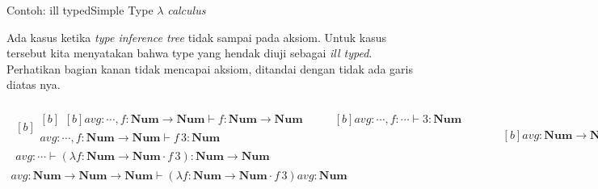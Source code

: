 \documentclass[aspectratio=1610,10pt,handout]{beamer}
\newcommand{\lc}{$\lambda$ {\it calculus}\ }
\begin{document}
\begin{frame}{Contoh:  ill typed}{Simple Type \lc }

	Ada kasus ketika \emph{type inference tree} tidak sampai pada aksiom. Untuk kasus tersebut kita menyatakan bahwa type yang hendak diuji sebagai \emph{ill typed}. Perhatikan bagian kanan tidak mencapai aksiom, ditandai dengan tidak ada garis diatas nya.

	  \begingroup\tiny%
	  \[
	  \begin{gathered}
	  \begin{gathered}[b]
	  \begin{gathered}[b]
	  \begin{gathered}[b]
	  \hline
	  \mathit{avg} : \cdots,
	  f : \mathbf{Num} \to \mathbf{Num}
	  \vdash
	  f
	  :  \mathbf{Num} \to \mathbf{Num}
	  \end{gathered}
	  \qquad
	  \begin{gathered}[b]
	  \hline
	  \mathit{avg} : \cdots,
	  f : \cdots
	  \vdash
	  3
	  : \mathbf{Num}
	  \end{gathered}
	  \\
	  \hline
	  \mathit{avg} : \cdots,
	  f : \mathbf{Num} \to \mathbf{Num}
	  \vdash
	  f\,3
	  : \mathbf{Num}
	  \end{gathered}\\
	  \hline
	  \mathit{avg} : \cdots
	  \vdash
	  (\lambda f : \mathbf{Num} \to \mathbf{Num} \cdot f\,3)
	  : \mathbf{Num} \to \mathbf{Num}
	  \end{gathered}
	  \qquad
	  \begin{gathered}[b]
	  \mathit{avg} :  \mathbf{Num} \to\mathbf{Num} \to\mathbf{Num}
	  \vdash
	  \mathit{avg}
	  : \mathbf{Num}
	  \end{gathered}
	  \\
	  \hline
	  \mathit{avg} : \mathbf{Num} \to\mathbf{Num} \to\mathbf{Num} \vdash
	  (\lambda f : \mathbf{Num} \to \mathbf{Num} \cdot f\,3) \mathit{avg}
	  : \mathbf{Num}
	  \end{gathered}
	  \]
	  \endgroup%



\end{frame}
\end{document}
